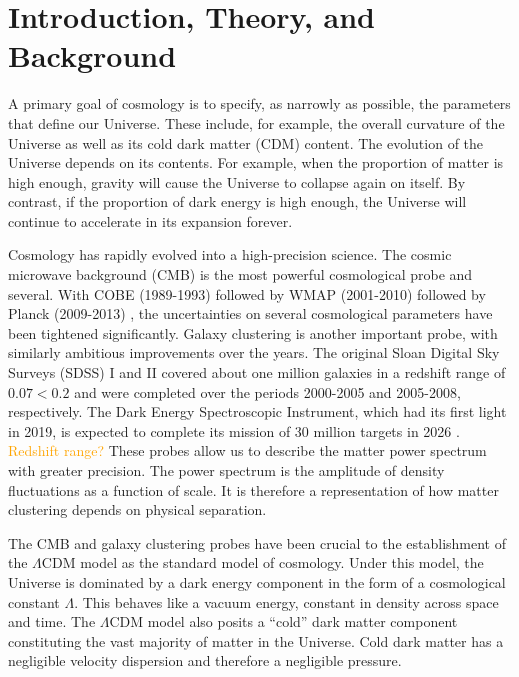 \chapter{Introduction, Theory, and Background}


A primary goal of cosmology is to specify, as narrowly as possible, the 
parameters that define our Universe. These include, for example, the overall 
curvature of the Universe as well as its cold dark matter (CDM) content. The 
evolution of the Universe depends on its contents. For example, when the 
proportion of matter is high enough,
gravity will cause the Universe to collapse again on itself. By contrast, if
the proportion of dark energy is high enough, the Universe will continue to
accelerate in its expansion forever.

Cosmology has rapidly evolved into a high-precision science. The cosmic
microwave background (CMB) is the most powerful cosmological probe and
several. With
COBE (1989-1993)  followed by WMAP (2001-2010)  followed 
by Planck (2009-2013) , the uncertainties on several cosmological 
parameters have been tightened significantly.
Galaxy clustering is another important probe, with similarly ambitious
improvements over the years. The original Sloan Digital Sky Surveys (SDSS) I
and II covered about one million galaxies in a redshift range of $0.07 < 0.2$
and were completed over the periods 2000-2005 and 2005-2008, respectively.
The Dark Energy Spectroscopic Instrument, which had its first light in 2019, 
is expected to complete its mission of 30 million targets in 2026
. \textcolor{orange}{Redshift range?}
These probes allow us to describe the matter power spectrum
with greater precision. The power spectrum is the amplitude of density
fluctuations as a function of scale. It is therefore a representation of how
matter clustering depends on physical separation.

The CMB and galaxy clustering probes have been crucial to the establishment
of the $\Lambda$CDM model as the standard model of cosmology. Under this
model, the Universe is dominated by a dark energy component in the form of a
cosmological constant $\Lambda$. This behaves like a vacuum energy, constant
in density across space and time. The $\Lambda$CDM model also posits a 
``cold'' dark
matter component constituting the vast majority of matter in the Universe. 
Cold dark matter has a negligible velocity dispersion and therefore a
negligible pressure.

